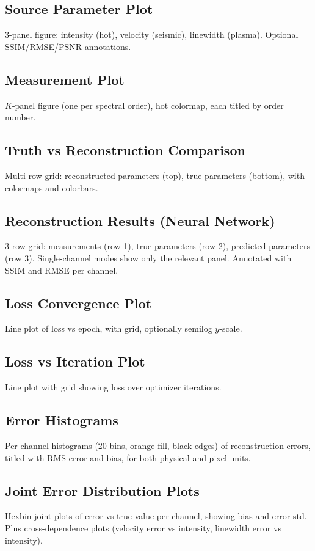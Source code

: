 \documentclass[11pt,a4paper]{article}
\begin{document}
\subsection{Source Parameter Plot}
3-panel figure: intensity (hot), velocity (seismic), linewidth (plasma). Optional SSIM/RMSE/PSNR annotations.

\subsection{Measurement Plot}
$K$-panel figure (one per spectral order), hot colormap, each titled by order number.

\subsection{Truth vs Reconstruction Comparison}
Multi-row grid: reconstructed parameters (top), true parameters (bottom), with colormaps and colorbars.

\subsection{Reconstruction Results (Neural Network)}
3-row grid: measurements (row 1), true parameters (row 2), predicted parameters (row 3). Single-channel modes show only the relevant panel. Annotated with SSIM and RMSE per channel.

\subsection{Loss Convergence Plot}
Line plot of loss vs epoch, with grid, optionally semilog $y$-scale.

\subsection{Loss vs Iteration Plot}
Line plot with grid showing loss over optimizer iterations.

\subsection{Error Histograms}
Per-channel histograms (20 bins, orange fill, black edges) of reconstruction errors, titled with RMS error and bias, for both physical and pixel units.

\subsection{Joint Error Distribution Plots}
Hexbin joint plots of error vs true value per channel, showing bias and error std. Plus cross-dependence plots (velocity error vs intensity, linewidth error vs intensity).
\end{document}
